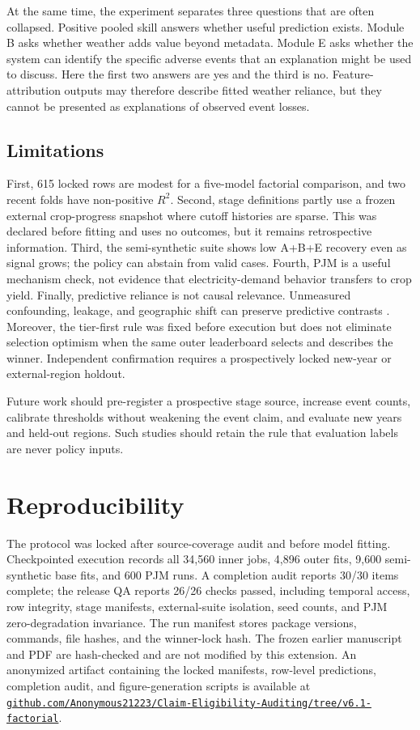 \documentclass[conference]{IEEEtran}
\begin{document}
At the same time, the experiment separates three questions that are often
collapsed. Positive pooled skill answers whether useful prediction exists.
Module B asks whether weather adds value beyond metadata. Module E asks whether
the system can identify the specific adverse events that an explanation might
be used to discuss. Here the first two answers are yes and the third is no.
Feature-attribution outputs may therefore describe fitted weather reliance, but
they cannot be presented as explanations of observed event losses.

\subsection{Limitations}
First, 615 locked rows are modest for a five-model factorial comparison, and two
recent folds have non-positive $R^2$. Second, stage definitions partly use a
frozen external crop-progress snapshot where cutoff histories are sparse. This
was declared before fitting and uses no outcomes, but it remains retrospective
information. Third, the semi-synthetic suite shows low A+B+E recovery even as
signal grows; the policy can abstain from valid cases. Fourth, PJM is a useful
mechanism check, not evidence that electricity-demand behavior transfers to
crop yield. Finally, predictive reliance is not causal relevance. Unmeasured
confounding, leakage, and geographic shift can preserve predictive contrasts
\cite{Janzing2020,KapoorNarayanan2023}. Moreover, the tier-first rule was fixed
before execution but does not eliminate selection optimism when the same outer
leaderboard selects and describes the winner. Independent confirmation requires
a prospectively locked new-year or external-region holdout.

Future work should pre-register a prospective stage source, increase event
counts, calibrate thresholds without weakening the event claim, and evaluate
new years and held-out regions. Such studies should retain the rule that
evaluation labels are never policy inputs.

\section{Reproducibility}
The protocol was locked after source-coverage audit and before model fitting.
Checkpointed execution records all 34,560 inner jobs, 4,896 outer fits, 9,600
semi-synthetic base fits, and 600 PJM runs. A completion audit reports 30/30
items complete; the release QA reports 26/26 checks passed, including temporal
access, row integrity, stage manifests, external-suite isolation, seed counts,
and PJM zero-degradation invariance. The run manifest stores package versions,
commands, file hashes, and the winner-lock hash. The frozen earlier manuscript
and PDF are hash-checked and are not modified by this extension.
An anonymized artifact containing the locked manifests, row-level predictions,
completion audit, and figure-generation scripts is available at
\href{https://github.com/Anonymous21223/Claim-Eligibility-Auditing/tree/v6.1-factorial}
{\nolinkurl{github.com/Anonymous21223/Claim-Eligibility-Auditing/tree/v6.1-factorial}}.
\end{document}
